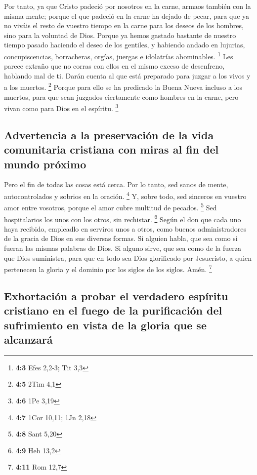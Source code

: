 Por tanto, ya que Cristo padeció por nosotros en la
carne, armaos también con la misma mente; porque el que padeció en la
carne ha dejado de pecar,  para que ya no viváis el resto
de vuestro tiempo en la carne para los deseos de los hombres, sino para
la voluntad de Dios.  Porque ya hemos gastado bastante de
nuestro tiempo pasado haciendo el deseo de los gentiles, y habiendo
andado en lujurias, concupiscencias, borracheras, orgías, juergas e
idolatrías abominables. \footnote{\textbf{4:3} Efes 2,2-3; Tit 3,3}
 Les parece extraño que no corras con ellos en el mismo
exceso de desenfreno, hablando mal de ti.  Darán cuenta al
que está preparado para juzgar a los vivos y a los muertos. \footnote{\textbf{4:5}
  2Tim 4,1}  Porque para ello se ha predicado la Buena
Nueva incluso a los muertos, para que sean juzgados ciertamente como
hombres en la carne, pero vivan como para Dios en el espíritu.
\footnote{\textbf{4:6} 1Pe 3,19}

\hypertarget{advertencia-a-la-preservaciuxf3n-de-la-vida-comunitaria-cristiana-con-miras-al-fin-del-mundo-pruxf3ximo}{%
\subsection{Advertencia a la preservación de la vida comunitaria
cristiana con miras al fin del mundo
próximo}\label{advertencia-a-la-preservaciuxf3n-de-la-vida-comunitaria-cristiana-con-miras-al-fin-del-mundo-pruxf3ximo}}

 Pero el fin de todas las cosas está cerca. Por lo tanto,
sed sanos de mente, autocontrolados y sobrios en la oración. \footnote{\textbf{4:7}
  1Cor 10,11; 1Jn 2,18}  Y, sobre todo, sed sinceros en
vuestro amor entre vosotros, porque el amor cubre multitud de pecados.
\footnote{\textbf{4:8} Sant 5,20}  Sed hospitalarios los
unos con los otros, sin rechistar. \footnote{\textbf{4:9} Heb 13,2}
 Según el don que cada uno haya recibido, empleadlo en
serviros unos a otros, como buenos administradores de la gracia de Dios
en sus diversas formas.  Si alguien habla, que sea como
si fueran las mismas palabras de Dios. Si alguno sirve, que sea como de
la fuerza que Dios suministra, para que en todo sea Dios glorificado por
Jesucristo, a quien pertenecen la gloria y el dominio por los siglos de
los siglos. Amén. \footnote{\textbf{4:11} Rom 12,7}

\hypertarget{exhortaciuxf3n-a-probar-el-verdadero-espuxedritu-cristiano-en-el-fuego-de-la-purificaciuxf3n-del-sufrimiento-en-vista-de-la-gloria-que-se-alcanzaruxe1}{%
\subsection{Exhortación a probar el verdadero espíritu cristiano en el
fuego de la purificación del sufrimiento en vista de la gloria que se
alcanzará}\label{exhortaciuxf3n-a-probar-el-verdadero-espuxedritu-cristiano-en-el-fuego-de-la-purificaciuxf3n-del-sufrimiento-en-vista-de-la-gloria-que-se-alcanzaruxe1}}

